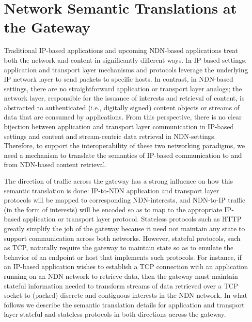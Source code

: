 \section{Network Semantic Translations at the Gateway} \label{sec:gateway}
Traditional IP-based applications and upcoming NDN-based applications treat both the network and content in significantly different ways. In IP-based settings, application and transport layer mechanisms and protocols leverage the underlying IP network layer to send packets to specific hosts. In contrast, in NDN-based settings, there are no straightforward application or transport layer analogs; the network layer, responsible for the issuance of interests and retrieval of content, is abstracted to authenticated (i.e., digitally signed) content objects or streams of data that are consumed by applications. From this perspective, there is no clear bijection between application and transport layer communication in IP-based settings and content and stream-centric data retrieval in NDN-settings. Therefore, to support the interoperability of these two networking paradigms, we need a mechanism to translate the semantics of IP-based communication to and from NDN-based content retrieval. 

The direction of traffic across the gateway has a strong influence on how this semantic translation is done: IP-to-NDN application and transport layer protocols will be mapped to corresponding NDN-interests, and NDN-to-IP traffic (in the form of interests) will be encoded so as to map to the appropriate IP-based application or transport layer protocol. Stateless protocols such as HTTP greatly simplify the job of the gateway because it need not maintain any state to support communication across both networks. However, stateful protocols, such as TCP, naturally require the gateway to maintain state so as to emulate the behavior of an endpoint or host that implements such protocols. For instance, if an IP-based application wishes to establish a TCP connection with an application running on an NDN network to retrieve data, then the gateway must maintain stateful information needed to transform streams of data retrieved over a TCP socket to (packed) discrete and contiguous interests in the NDN network. In what follows we describe the semantic translation details for application and transport layer stateful and stateless protocols in both directions across the gateway. 

